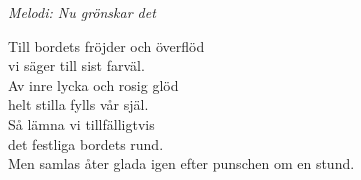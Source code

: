 {\footnotesize\textit{Melodi: Nu grönskar det}}\par
\vspace{10pt}
Till bordets fröjder och överflöd\\
vi säger till sist farväl.\\
Av inre lycka och rosig glöd\\
helt stilla fylls vår själ.\\
Så lämna vi tillfälligtvis\\
det festliga bordets rund.\\
Men samlas åter glada igen efter punschen om en stund.
